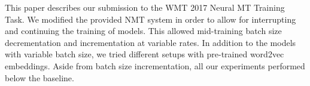 This paper describes our submission to the WMT 2017 Neural MT Training Task. We modified the provided NMT system in order to allow for interrupting and continuing the training of models. This allowed mid-training batch size decrementation and incrementation at variable rates. In addition to the models with variable batch size, we tried different setups with pre-trained word2vec embeddings. Aside from batch size incrementation, all our experiments performed below the baseline.
